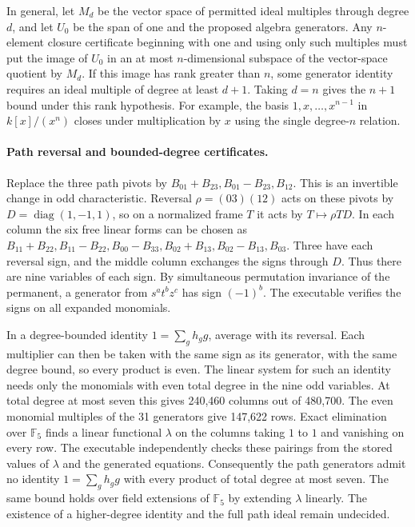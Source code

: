 In general, let \(M_d\) be the vector space of permitted ideal
multiples through degree \(d\), and let \(U_0\) be the span of one
and the proposed algebra generators. Any \(n\)-element closure
certificate beginning with one and using only such multiples
must put the image of \(U_0\) in an at most \(n\)-dimensional
subspace of the vector-space quotient by \(M_d\).
If this image has rank greater than \(n\), some generator identity
requires an ideal multiple of degree at least \(d+1\). Taking \(d=n\)
gives the \(n+1\) bound under this rank hypothesis. For example,
the basis \(1,x,\ldots,x^{n-1}\) in \(k[x]/(x^n)\) closes under
multiplication by \(x\) using the single degree-\(n\) relation.

\paragraph{Path reversal and bounded-degree certificates.}
Replace the three path pivots by \(B_{01}+B_{23}, B_{01}-B_{23}, B_{12}\).
This is an invertible change in odd characteristic.
Reversal \(\rho=(03)(12)\) acts on these pivots by
\(D=\operatorname{diag}(1,-1,1)\), so on a normalized frame \(T\)
it acts by \(T\mapsto\rho TD\).
In each column the six free linear forms can be chosen as
\(B_{11}+B_{22}, B_{11}-B_{22}, B_{00}-B_{33},
B_{02}+B_{13}, B_{02}-B_{13}, B_{03}\).
Three have each reversal sign, and the middle column exchanges the
signs through \(D\). Thus there are nine variables of each sign.
By simultaneous permutation invariance of the permanent, a generator
from \(s^at^bz^c\) has sign \((-1)^b\).
The executable verifies the signs on all expanded monomials.

In a degree-bounded identity \(1=\sum_g h_g g\), average with its
reversal. Each multiplier can then be taken with the same sign as its
generator, with the same degree bound, so every product is even.
The linear system for such an identity needs only the monomials with
even total degree in the nine odd variables. At total degree at most
seven this gives 240,460 columns out of 480,700.
The even monomial multiples of the 31 generators give 147,622 rows.
Exact elimination over \(\mathbb F_5\) finds a linear functional
\(\lambda\) on the columns taking \(1\) to \(1\) and vanishing on
every row. The executable independently checks these pairings from
the stored values of \(\lambda\) and the generated equations.
Consequently the path generators admit no identity
\(1=\sum_g h_g g\) with every product of total degree at most
seven. The same bound holds over field extensions of
\(\mathbb F_5\) by extending \(\lambda\) linearly.
The existence of a higher-degree identity and the full path ideal
remain undecided.

